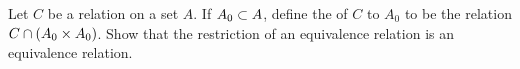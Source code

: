 \documentclass[../main.tex]{subfiles}
\begin{document}
\problem{}\label{s3p2}

Let \(C\) be a relation on a set \(A\). If \(A_0 \subset A\), define the
 of \(C\) to \(A_0\) to be the relation
\(C \cap (A_0 \times A_0)\). Show that the restriction of an equivalence
relation is an equivalence relation.

\todo{}
%
\end{document}
